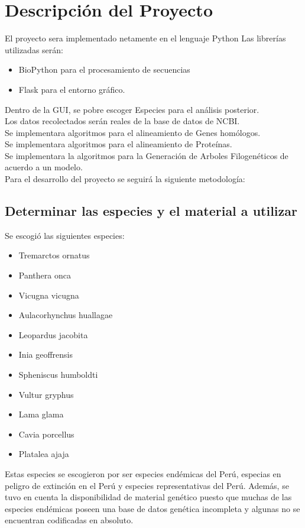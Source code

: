 \documentclass[a4paper]{article}
\begin{document}
\section{Descripción del Proyecto}

El proyecto sera implementado netamente en el lenguaje Python
Las librerías utilizadas serán:
\begin{itemize}
\item BioPython para el procesamiento de secuencias
\item Flask para el entorno gráfico.
\end{itemize}
Dentro de la GUI, se pobre escoger Especies para el análisis posterior.\\
Los datos recolectados serán reales de la base de datos de NCBI.\\
Se implementara algoritmos para el alineamiento de Genes homólogos.\\
Se implementara algoritmos para el alineamiento de Proteínas.\\
Se implementara la algoritmos para la Generación de Arboles Filogenéticos de acuerdo a un modelo.\\

\noindent Para el desarrollo del proyecto se seguirá la siguiente metodología:

\subsection{Determinar las especies y el material a utilizar}
Se escogió las siguientes especies:
\begin{itemize}
    \item Tremarctos ornatus
    \item Panthera onca
    \item Vicugna vicugna
    \item Aulacorhynchus huallagae
    \item Leopardus jacobita
    \item Inia geoffrensis
    \item Spheniscus humboldti
    \item Vultur gryphus
    \item Lama glama
    \item Cavia porcellus
    \item Platalea ajaja
\end{itemize}

Estas especies se escogieron por ser especies endémicas del Perú, especias en peligro de extinción en el Perú y especies representativas del Perú. Además, se tuvo en cuenta la disponibilidad de material genético puesto que muchas de las especies endémicas poseen una base de datos genética incompleta y algunas no se encuentran codificadas en absoluto.
\end{document}
